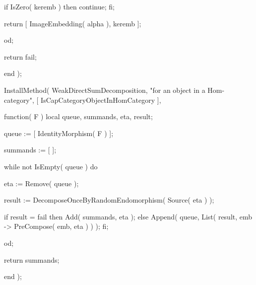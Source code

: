         if IsZero( keremb ) then
            continue;
        fi;
        
        return [ ImageEmbedding( alpha ), keremb ];
        
    od;
    
    return fail;
    
end );


InstallMethod( WeakDirectSumDecomposition,
        "for an object in a Hom-category",
        [ IsCapCategoryObjectInHomCategory ],
        
  function( F )
    local queue, summands, eta, result;
    
    queue := [ IdentityMorphism( F ) ];
    
    summands := [ ];
    
    while not IsEmpty( queue ) do
        
        eta := Remove( queue );
        
        result := DecomposeOnceByRandomEndomorphism( Source( eta ) );
        
        if result = fail then
            Add( summands, eta );
        else
            Append( queue, List( result, emb -> PreCompose( emb, eta ) ) );
        fi;
        
    od;
    
    return summands;
    
end );



















